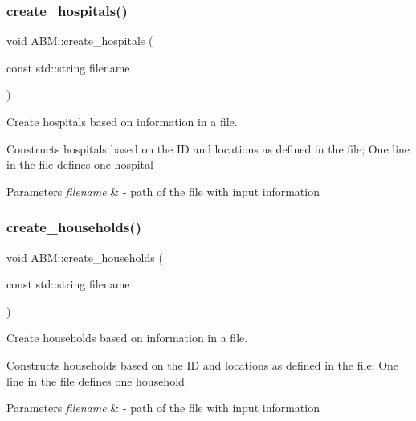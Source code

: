 \subsubsection{\texorpdfstring{create\+\_\+hospitals()}{create\_hospitals()}}
{\footnotesize\ttfamily void A\+B\+M\+::create\+\_\+hospitals (\begin{DoxyParamCaption}\item[{const std\+::string}]{filename }\end{DoxyParamCaption})}



Create hospitals based on information in a file. 

Constructs hospitals based on the ID and locations as defined in the file; One line in the file defines one hospital


\begin{DoxyParams}{Parameters}
{\em filename} & -\/ path of the file with input information \\
\hline
\end{DoxyParams}
\mbox{\label{classABM_ad0aa7567bd46beee2233c4e5a3758fef}} 
\subsubsection{\texorpdfstring{create\+\_\+households()}{create\_households()}}
{\footnotesize\ttfamily void A\+B\+M\+::create\+\_\+households (\begin{DoxyParamCaption}\item[{const std\+::string}]{filename }\end{DoxyParamCaption})}



Create households based on information in a file. 

Constructs households based on the ID and locations as defined in the file; One line in the file defines one household


\begin{DoxyParams}{Parameters}
{\em filename} & -\/ path of the file with input information \\
\hline
\end{DoxyParams}
\mbox{\label{classABM_afdc04bbe24f059dc3fa22d3d88276db5}} 
